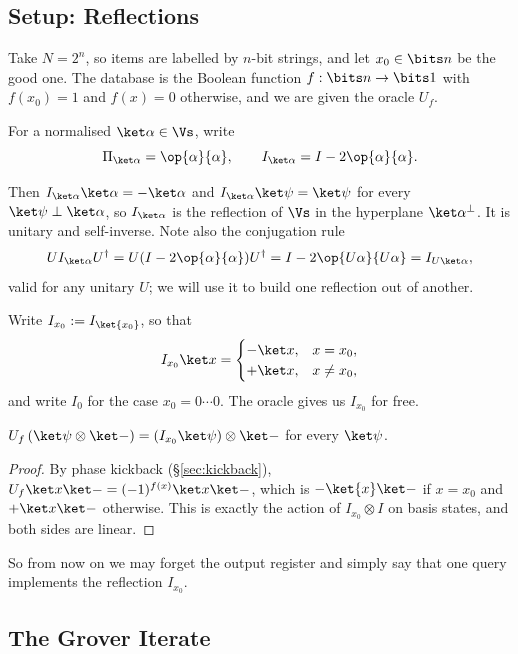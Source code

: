 \subsection{Setup: Reflections}

Take $N = 2^n$, so items are labelled by $n$-bit strings, and let $x_0\in\bits n$ be the good one. The database is the Boolean function $f:\bits n\to\bits1$ with $f(x_0)=1$ and $f(x)=0$ otherwise, and we are given the oracle $U_f$.

\begin{definition}
	For a normalised $\ket\alpha\in\Vs$, write
	$$\Pi_{\ket\alpha} = \op{\alpha}{\alpha}, \qquad I_{\ket\alpha} = I - 2\op{\alpha}{\alpha}.$$
\end{definition}

Then $I_{\ket\alpha}\ket\alpha = -\ket\alpha$ and $I_{\ket\alpha}\ket\psi = \ket\psi$ for every $\ket\psi\perp\ket\alpha$, so $I_{\ket\alpha}$ is the reflection of $\Vs$ in the hyperplane $\ket\alpha^\perp$. It is unitary and self-inverse. Note also the conjugation rule
$$UI_{\ket\alpha}U^\dagger = U(I - 2\op{\alpha}{\alpha})U^\dagger = I - 2\op{U\alpha}{U\alpha} = I_{U\ket\alpha},$$
valid for any unitary $U$; we will use it to build one reflection out of another.

Write $I_{x_0} := I_{\ket{x_0}}$, so that
$$I_{x_0}\ket x = \begin{cases} -\ket x, & x = x_0,\\ +\ket x, &x\neq x_0,\end{cases}$$
and write $I_0$ for the case $x_0 = 0\cdots0$. The oracle gives us $I_{x_0}$ for free.

\begin{proposition}
	$U_f\left(\ket\psi\otimes\ket-\right) = \left(I_{x_0}\ket\psi\right)\otimes\ket-$ for every $\ket\psi$.
\end{proposition}

\begin{proof}
	By phase kickback (\S\ref{sec:kickback}), $U_f\ket x\ket- = (-1)^{f(x)}\ket x\ket-$, which is $-\ket{x}\ket-$ if $x = x_0$ and $+\ket x\ket-$ otherwise. This is exactly the action of $I_{x_0}\otimes I$ on basis states, and both sides are linear.
\end{proof}

So from now on we may forget the output register and simply say that one query implements the reflection $I_{x_0}$.

\subsection{The Grover Iterate}

